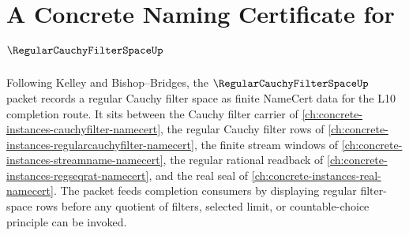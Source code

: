 \chapter{A Concrete Naming Certificate for $\RegularCauchyFilterSpaceUp$}
\label{ch:concrete-instances-regular-cauchy-filter-space-namecert}

Following Kelley and Bishop--Bridges, the $\RegularCauchyFilterSpaceUp$ packet records a regular Cauchy filter space as finite NameCert data for the L10 completion route. It sits between the Cauchy filter carrier of \autoref{ch:concrete-instances-cauchyfilter-namecert}, the regular Cauchy filter rows of \autoref{ch:concrete-instances-regularcauchyfilter-namecert}, the finite stream windows of \autoref{ch:concrete-instances-streamname-namecert}, the regular rational readback of \autoref{ch:concrete-instances-regseqrat-namecert}, and the real seal of \autoref{ch:concrete-instances-real-namecert}. The packet feeds completion consumers by displaying regular filter-space rows before any quotient of filters, selected limit, or countable-choice principle can be invoked.

